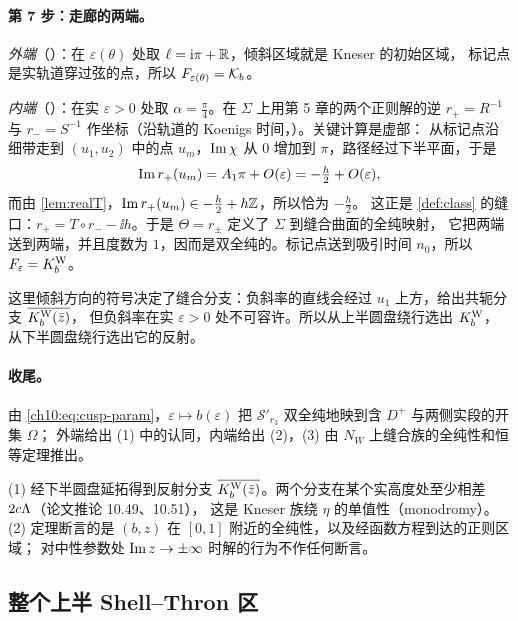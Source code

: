\paragraph{第 7 步：走廊的两端。}
\emph{外端}（\cite[命题~10.12]{KneserPaper}）：在 $\varepsilon(\theta)$ 处取 $\ell=\mathrm{i}\pi+\mathbb{R}$，倾斜区域就是 Kneser 的初始区域，
标记点是实轨道穿过弦的点，所以 $F_{\varepsilon(\theta)}=\mathcal K_{b}$。

\emph{内端}（\cite[命题~10.13]{KneserPaper}）：在实 $\varepsilon>0$ 处取 $\alpha=\tfrac\pi4$。在 $\Sigma$ 上用第 5 章的两个正则解的逆
$r_+=R^{-1}$ 与 $r_-=S^{-1}$ 作坐标（沿轨道的 Koenigs 时间，\cite[引理~10.10]{KneserPaper}）。关键计算是虚部：
从标记点沿细带走到 $(u_1,u_2)$ 中的点 $u_m$，$\operatorname{Im}\chi$ 从 $0$ 增加到 $\pi$，路径经过下半平面，于是
\[
  \operatorname{Im} r_+(u_m)=A_1\pi+O(\varepsilon)=-\tfrac h2+O(\varepsilon),
\]
而由 \cref{lem:realT}，$\operatorname{Im} r_+(u_m)\in-\tfrac h2+h\mathbb{Z}$，所以恰为 $-\tfrac h2$。
这正是 \cref{def:class} 的缝口：$r_+=T\circ r_--\ii h$。于是 $\Theta=r_\pm$ 定义了 $\Sigma$ 到缝合曲面的全纯映射，
它把两端送到两端，并且度数为 $1$，因而是双全纯的。标记点送到吸引时间 $n_0$，所以 $F_\varepsilon=K^{\mathrm W}_b$。

这里倾斜方向的符号决定了缝合分支：负斜率的直线会经过 $u_1$ 上方，给出共轭分支 $\overline{K^{\mathrm W}_b(\bar z)}$，
但负斜率在实 $\varepsilon>0$ 处不可容许。所以从上半圆盘绕行选出 $K^{\mathrm W}_b$，从下半圆盘绕行选出它的反射。

\paragraph{收尾。}
由 \cref{ch10:eq:cusp-param}，$\varepsilon\mapsto b(\varepsilon)$ 把 $\mathcal S'_{r_3}$ 双全纯地映到含 $D^+$ 与两侧实段的开集 $\Omega$；
外端给出 (1) 中的认同，内端给出 (2)，(3) 由 $N_W$ 上缝合族的全纯性和恒等定理推出。

\begin{remark}\label{ch10:rem:cusp-scope}
(1) 经下半圆盘延拓得到反射分支 $\overline{K^{\mathrm W}_b(\bar z)}$。两个分支在某个实高度处至少相差 $2c\Lambda$（论文推论 10.49、10.51），
这是 Kneser 族绕 $\eta$ 的单值性（monodromy）。
(2) 定理断言的是 $(b,z)$ 在 $[0,1]$ 附近的全纯性，以及经函数方程到达的正则区域；
对中性参数处 $\operatorname{Im} z\to\pm\infty$ 时解的行为不作任何断言。
\end{remark}

\subsection{整个上半 Shell--Thron 区}\label{ch10:sec:global}

